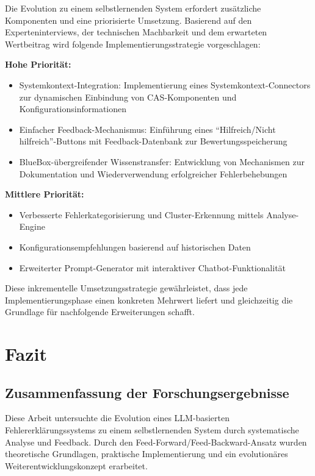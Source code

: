 \documentclass[
  a4paper,
  12pt,
  oneside,
  open=any,
  BCOR=12mm,
  DIV=14,
  parskip=half*,
  headsepline,
  footsepline,
  pointlessnumbers,
  liststotoc,
  numbers=noenddot,
  listof=totoc]{scrartcl}
\begin{document}
Die Evolution zu einem selbstlernenden System erfordert zusätzliche
Komponenten und eine priorisierte Umsetzung. Basierend auf den
Experteninterviews, der technischen Machbarkeit und dem erwarteten
Wertbeitrag wird folgende Implementierungsstrategie vorgeschlagen:

\textbf{Hohe Priorität:}

\begin{itemize}
\item
  Systemkontext-Integration: Implementierung eines
  Systemkontext-Connectors zur dynamischen Einbindung von
  CAS-Komponenten und Konfigurationsinformationen
\item
  Einfacher Feedback-Mechanismus: Einführung eines ``Hilfreich/Nicht
  hilfreich''-Buttons mit Feedback-Datenbank zur Bewertungsspeicherung
\item
  BlueBox-übergreifender Wissenstransfer: Entwicklung von Mechanismen
  zur Dokumentation und Wiederverwendung erfolgreicher Fehlerbehebungen
\end{itemize}

\textbf{Mittlere Priorität:}

\begin{itemize}
\item
  Verbesserte Fehlerkategorisierung und Cluster-Erkennung mittels
  Analyse-Engine
\item
  Konfigurationsempfehlungen basierend auf historischen Daten
\item
  Erweiterter Prompt-Generator mit interaktiver Chatbot-Funktionalität
\end{itemize}

Diese inkrementelle Umsetzungsstrategie gewährleistet, dass jede
Implementierungsphase einen konkreten Mehrwert liefert und gleichzeitig
die Grundlage für nachfolgende Erweiterungen schafft.

\section{Fazit}\label{fazit}

\subsection{Zusammenfassung der
Forschungsergebnisse}\label{zusammenfassung-der-forschungsergebnisse}

Diese Arbeit untersuchte die Evolution eines LLM-basierten
Fehlererklärungssystems zu einem selbstlernenden System durch
systematische Analyse und Feedback. Durch den
Feed-Forward/Feed-Backward-Ansatz wurden theoretische Grundlagen,
praktische Implementierung und ein evolutionäres
Weiterentwicklungskonzept erarbeitet.
\end{document}
